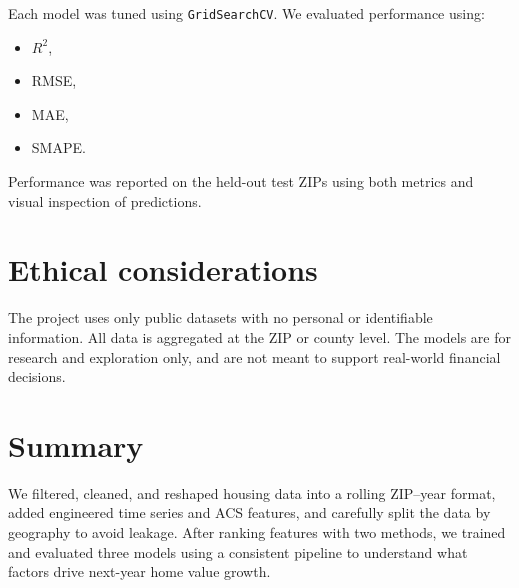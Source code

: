 Each model was tuned using \texttt{GridSearchCV}. We evaluated performance using:
\begin{itemize}
    \item $R^2$,
    \item RMSE,
    \item MAE,
    \item SMAPE.
\end{itemize}

Performance was reported on the held-out test ZIPs using both metrics and visual inspection of predictions.

\section{Ethical considerations}
The project uses only public datasets with no personal or identifiable information. All data is aggregated at the ZIP or county level. The models are for research and exploration only, and are not meant to support real-world financial decisions.

\section{Summary}
We filtered, cleaned, and reshaped housing data into a rolling ZIP–year format, added engineered time series and ACS features, and carefully split the data by geography to avoid leakage. After ranking features with two methods, we trained and evaluated three models using a consistent pipeline to understand what factors drive next-year home value growth.
